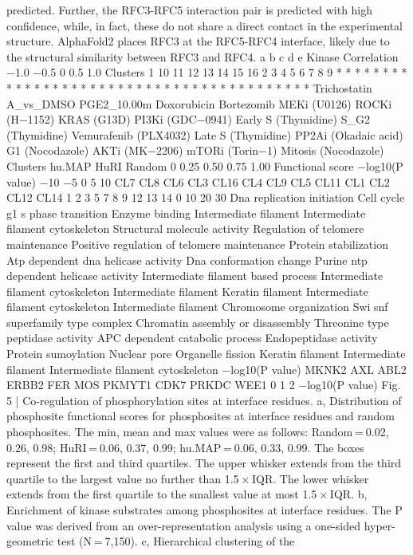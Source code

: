 predicted. Further, the RFC3-RFC5 interaction pair is predicted with
high confidence, while, in fact, these do not share a direct contact in
the experimental structure. AlphaFold2 places RFC3 at the RFC5-RFC4
interface, likely due to the structural similarity between RFC3
and RFC4.
a
b
c
d
e
Kinase
Correlation
−1.0
−0.5
0
0.5
1.0
Clusters
1
10
11
12
13
14
15
16
2
3
4
5
6
7
8
9
*
*
*
* *
*
*
*
*
* *
*
*
* *
* *
*
*
*
*
*
*
* *
*
*
*
*
*
* *
* *
*
*
*
*
* *
*
Trichostatin A\_vs\_DMSO
PGE2\_10.00m
Doxorubicin
Bortezomib
MEKi (U0126)
ROCKi (H−1152)
KRAS (G13D)
PI3Ki (GDC−0941)
Early S (Thymidine)
S\_G2 (Thymidine)
Vemurafenib (PLX4032)
Late S (Thymidine)
PP2Ai (Okadaic acid)
G1 (Nocodazole)
AKTi (MK−2206)
mTORi (Torin−1)
Mitosis (Nocodazole)
Clusters
hu.MAP
HuRI
Random
0
0.25
0.50
0.75
1.00
Functional score
−log10(P value)
−10
−5
0
5
10
CL7
CL8
CL6
CL3
CL16
CL4
CL9
CL5
CL11
CL1
CL2
CL12
CL14
1
2
3
5
7
8
9
12
13
14
0
10
20
30
Dna replication initiation
Cell cycle g1 s phase transition
Enzyme binding
Intermediate filament
Intermediate filament cytoskeleton
Structural molecule activity
Regulation of telomere maintenance
Positive regulation of telomere maintenance
Protein stabilization
Atp dependent dna helicase activity
Dna conformation change
Purine ntp dependent helicase activity
Intermediate filament based process
Intermediate filament cytoskeleton
Intermediate filament
Keratin filament
Intermediate filament cytoskeleton
Intermediate filament
Chromosome organization
Swi snf superfamily type complex
Chromatin assembly or disassembly
Threonine type peptidase activity
APC dependent catabolic process
Endopeptidase activity
Protein sumoylation
Nuclear pore
Organelle fission
Keratin filament
Intermediate filament
Intermediate filament cytoskeleton
−log10(P value)
MKNK2
AXL
ABL2
ERBB2
FER
MOS
PKMYT1
CDK7
PRKDC
WEE1
0
1
2
−log10(P value)
Fig. 5 | Co-regulation of phosphorylation sites at interface residues.
a, Distribution of phosphosite functional scores for phosphosites at interface
residues and random phosphosites. The min, mean and max values were as
follows: Random = 0.02, 0.26, 0.98; HuRI = 0.06, 0.37, 0.99; hu.MAP = 0.06,
0.33, 0.99. The boxes represent the first and third quartiles. The upper whisker
extends from the third quartile to the largest value no further than 1.5 × IQR.
The lower whisker extends from the first quartile to the smallest value at most
1.5 × IQR. b, Enrichment of kinase substrates among phosphosites at interface
residues. The P value was derived from an over-representation analysis using
a one-sided hyper-geometric test (N = 7,150). c, Hierarchical clustering of the
